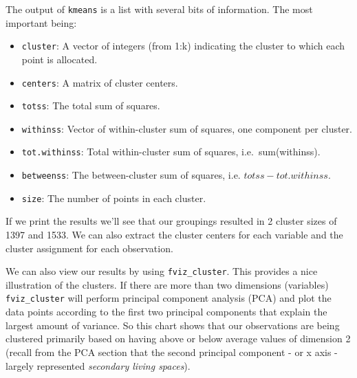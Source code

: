 \documentclass[]{book}
\newenvironment{Shaded}{\begin{snugshade}}{\end{snugshade}}
\newcommand{\KeywordTok}[1]{\textcolor[rgb]{0.13,0.29,0.53}{\textbf{#1}}}
\newcommand{\NormalTok}[1]{#1}
\providecommand{\tightlist}{%
  \setlength{\itemsep}{0pt}\setlength{\parskip}{0pt}}
\theoremstyle{definition}
\theoremstyle{definition}
\theoremstyle{definition}
\theoremstyle{remark}
\begin{document}
The output of \texttt{kmeans} is a list with several bits of
information. The most important being:

\begin{itemize}
\tightlist
\item
  \texttt{cluster}: A vector of integers (from 1:k) indicating the
  cluster to which each point is allocated.
\item
  \texttt{centers}: A matrix of cluster centers.
\item
  \texttt{totss}: The total sum of squares.
\item
  \texttt{withinss}: Vector of within-cluster sum of squares, one
  component per cluster.
\item
  \texttt{tot.withinss}: Total within-cluster sum of squares,
  i.e.~sum(withinss).
\item
  \texttt{betweenss}: The between-cluster sum of squares, i.e.
  \(totss-tot.withinss\).
\item
  \texttt{size}: The number of points in each cluster.
\end{itemize}

If we print the results we'll see that our groupings resulted in 2
cluster sizes of 1397 and 1533. We can also extract the cluster centers
for each variable and the cluster assignment for each observation.

\begin{Shaded}
\end{Shaded}

We can also view our results by using \texttt{fviz\_cluster}. This
provides a nice illustration of the clusters. If there are more than two
dimensions (variables) \texttt{fviz\_cluster} will perform principal
component analysis (PCA) and plot the data points according to the first
two principal components that explain the largest amount of variance. So
this chart shows that our observations are being clustered primarily
based on having above or below average values of dimension 2 (recall
from the PCA section that the second principal component - or x axis -
largely represented \emph{secondary living spaces}).
\end{document}
